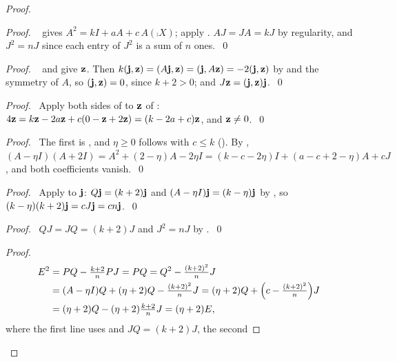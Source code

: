 \begin{proof}
 \begin{proof}\pf\  gives $A^2=kI+aA+c\,A(\comp X)$; apply
  . $AJ=JA=kJ$ by regularity, and $J^2=nJ$ since each entry of $J^2$ is a
  sum of $n$ ones.~\qed\end{proof}
 \begin{proof}\pf\  and  give ${\mathbf z}$. Then
  $k({\mathbf j},{\mathbf z})=(A{\mathbf j},{\mathbf z})=({\mathbf j},A{\mathbf z})=-2({\mathbf j},{\mathbf z})$ by  and the symmetry of $A$,
  so $({\mathbf j},{\mathbf z})=0$, since $k+2>0$; and $J{\mathbf z}=({\mathbf j},{\mathbf z}){\mathbf j}$.~\qed\end{proof}
 \begin{proof}\pf\ Apply both sides of  to ${\mathbf z}$ of :
  $4{\mathbf z}=k{\mathbf z}-2a{\mathbf z}+c(0-{\mathbf z}+2{\mathbf z})=(k-2a+c){\mathbf z}$, and ${\mathbf z}\ne0$.~\qed\end{proof}
 \begin{proof}\pf\ The first is , and $\eta\ge0$ follows with $c\le k$
  (). By ,
  $(A-\eta I)(A+2I)=A^2+(2-\eta)A-2\eta I=(k-c-2\eta)I+(a-c+2-\eta)A+cJ$, and both
  coefficients vanish.~\qed\end{proof}
 \begin{proof}\pf\ Apply  to ${\mathbf j}$: $Q{\mathbf j}=(k+2){\mathbf j}$ and
  $(A-\eta I){\mathbf j}=(k-\eta){\mathbf j}$ by , so
  $(k-\eta)(k+2){\mathbf j}=cJ{\mathbf j}=cn{\mathbf j}$.~\qed\end{proof}
 \begin{proof}\pf\ $QJ=JQ=(k+2)J$ and $J^2=nJ$ by .~\qed\end{proof}
 \begin{proof}\pf\
  \[
  \begin{split}
   E^2&=PQ-\tfrac{k+2}nPJ=PQ=Q^2-\tfrac{(k+2)^2}nJ\\
      &=(A-\eta I)Q+(\eta+2)Q-\tfrac{(k+2)^2}nJ
       =(\eta+2)Q+\Bigl(c-\tfrac{(k+2)^2}n\Bigr)J\\
      &=(\eta+2)Q-(\eta+2)\tfrac{k+2}nJ=(\eta+2)E,
  \end{split}
  \]
  where the first line uses  and $JQ=(k+2)J$, the second

\end{proof}
\end{proof}
